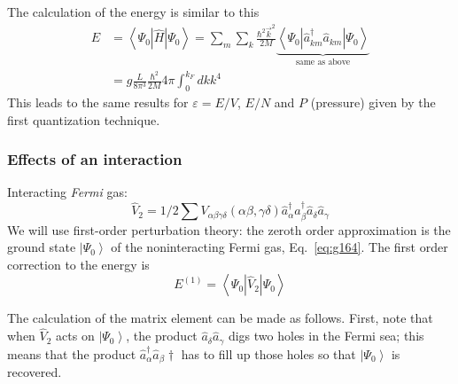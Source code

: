 \documentclass[12pt]{article}
\newcommand{\be}{\begin{equation}}
\newcommand{\ee}{\end{equation}}
\begin{document}

The calculation of the energy is similar to this
\be
\begin{aligned}
E
&=\left\langle\Psi_{0}|\hat{H}| \Psi_{0}\right\rangle
=\sum_{m} \sum_{k} \frac{\hbar^{2} \vec{k}^{2}}{2 M}
\underbrace{\left\langle\Psi_{0}\left|\hat{a}^\dagger_{k m} \hat{a}_{k m}\right| \Psi_{0}\right\rangle}%
_{\text{same as above}}\\
&=g \frac{L}{8 \pi^{3}} \frac{\hbar^{2}}{2 M} 4 \pi \int_{0}^{k_{F}} d k k^{4}
\end{aligned}
\ee
This leads to the same results
for $\varepsilon = E/V$, $E/N$ and $P$ (pressure) given
by the first quantization technique.

\subsubsection{Effects of an interaction}

Interacting \emph{Fermi} gas:
\be
\hat{V}_{2}=1 / 2 \sum V_{\alpha \beta \gamma \delta}(\alpha \beta, \gamma \delta) \hat{a}_{\alpha}^{\dagger} \hat{a}_{\beta}^{\dagger} \hat{a}_{\delta} \hat{a}_{\gamma}
\ee
We will use first-order perturbation theory: the
zeroth order approximation is the ground state $\left|\Psi_{0}\right\rangle$
of the noninteracting Fermi gas, Eq.~\eqref{eq:g164}. The first order
correction to the energy is
\be
E^{(1)}=\left\langle\Psi_{0}\left|\hat{V}_{2}\right| \Psi_{0}\right\rangle
\ee


The calculation of the matrix element can be made
as follows. First, note that when $\hat{V}_{2}$ acts on
$\left|\Psi_{0}\right\rangle$, the product $\hat{a}_{\delta} \hat{a}_{\gamma}$ digs two holes in the
Fermi sea; this means that the product $\hat{a}_{\alpha}^\dagger\hat{a}_{\beta}\dagger$
has to fill up those holes so that $\left|\Psi_{0}\right\rangle$ is recovered.
\end{document}

